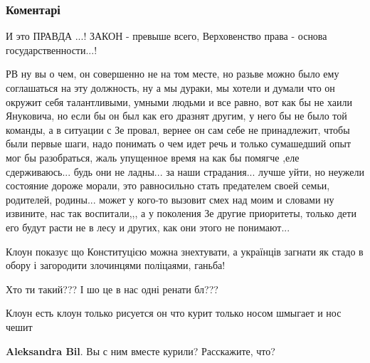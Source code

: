  
 
 
 
 
\subsubsection{Коментарі}

\begin{itemize} %

И это ПРАВДА ...! ЗАКОН - превыше всего, Верховенство права - основа
государственности...!



РВ ну вы о чем, он совершенно не на том месте, но разьве можно было ему
соглашаться на эту должность, ну а мы дураки, мы хотели и думали что он окружит
себя талантливыми, умными людьми и все равно, вот как бы не хаили Януковича, но
если бы он был как его дразнят другим, у него бы не было той команды, а в
ситуации с Зе провал, вернее он сам себе не принадлежит, чтобы были первые
шаги, надо понимать о чем идет речь и только сумашедший опыт мог бы
разобраться, жаль упущенное время на как бы помягче ,еле сдерживаюсь... будь они
не ладны... за наши страдания... лучше уйти, но неужели состояние дороже морали,
это равносильно стать предателем своей семьи, родителей, родины... может у
кого-то вызовит смех над моим и словами ну извините, нас так воспитали,,, а у
поколения Зе другие приоритеты, только дети его будут расти не в лесу и других,
как они этого не понимают...


Клоун показує що Конституцією можна знехтувати, а українців загнати як стадо в
обору і загородити злочинцями поліцаями, ганьба!


Хто ти такий??? І шо це в нас одні ренати бл???


Клоун есть клоун только рисуется он что курит только носом шмыгает и нос чешит

\begin{itemize} %
\textbf{Aleksandra Bil}. Вы с ним вместе курили? Расскажите, что?


\end{itemize}
\end{itemize}
